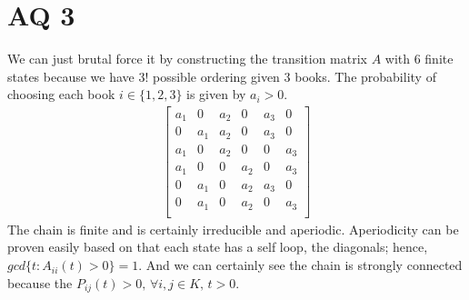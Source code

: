 \documentclass[11pt, letterpaper]{article}
\begin{document}
\section{AQ 3}
We can just brutal force it by constructing the transition matrix $A$ with 6 finite states because we have $3!$ possible ordering given 3 books. The probability of choosing each book $i \in \{1, 2, 3\}$ is given by $a_i > 0$.
\begin{align*}
    \begin{bmatrix}
        a_1 & 0 & a_2 & 0 & a_3 & 0 \\
        0 & a_1 & a_2 & 0 & a_3 & 0 \\
        a_1 & 0 & a_2 & 0 & 0 & a_3 \\
        a_1 & 0 & 0 & a_2 & 0 & a_3 \\
        0 & a_1 & 0 & a_2 & a_3 & 0 \\
        0 & a_1 & 0 & a_2 & 0 & a_3 \\
    \end{bmatrix}
\end{align*}
The chain is finite and is certainly irreducible and aperiodic. Aperiodicity can be proven easily based on that each state has a self loop, the diagonals; hence, $gcd\{t:A_{ii}(t) > 0\} = 1$. And we can certainly see the chain is strongly connected because the $P_{ij}(t) > 0, \, \forall i, j \in K, \, t > 0$.
\end{document}
